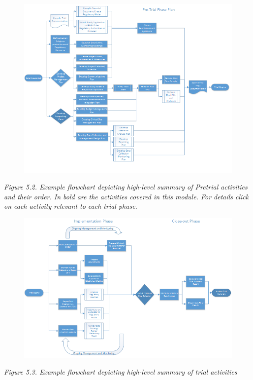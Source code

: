 \documentclass[]{book}
\begin{document}
\begin{figure}[htbp]
\centering
\includegraphics{images/book/pm2.png}
\caption{}
\end{figure}

\emph{Figure 5.2. Example flowchart depicting high-level summary of
Pretrial activities and their order. In bold are the activities covered
in this module. For details click on each activity relevant to each
trial phase. }

\begin{figure}[htbp]
\centering
\includegraphics{images/book/pm3.png}
\caption{}
\end{figure}

\emph{Figure 5.3. Example flowchart depicting high-level summary of
trial activities }
\end{document}
